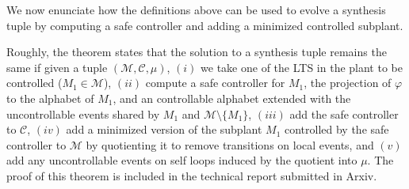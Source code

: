We now enunciate how the definitions above can be used to evolve a synthesis tuple by computing a safe controller and adding a minimized controlled subplant. 

Roughly, the theorem states that the solution to a synthesis tuple remains the same if given a tuple $(\mathcal{M}, \mathcal{C}, \mu)$, $(i)$ we take one of the LTS in the plant to be controlled ($M_1 \in \mathcal{M}$), $(ii)$ compute a safe controller for $M_1$, the projection of $\varphi$ to the alphabet of $M_1$, and an controllable alphabet extended with the uncontrollable events shared by $M_1$ and $\mathcal{M}\setminus \{M_1\}$, $(iii)$ add the safe controller to $\mathcal{C}$, $(iv)$ add a minimized version of the subplant $M_1$ controlled by the safe controller to  $\mathcal{M}$ by quotienting it to remove transitions on local events, and $(v)$ add any uncontrollable events on self loops induced by the quotient into $\mu$.  The proof of this theorem is included in the technical report submitted in Arxiv.







    
